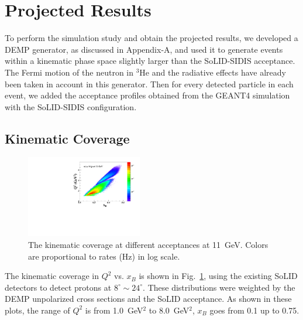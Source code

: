 \section{Projected Results}
To perform the simulation study and obtain the projected results, we developed a
DEMP generator, as discussed in Appendix-A, and used it to generate events within a
kinematic phase space slightly larger than the SoLID-SIDIS acceptance.  The
Fermi motion of the neutron in $\mathrm{^{3}He}$ and the radiative effects have
already been taken in account in this generator.  Then for every detected
particle in each event, we added the acceptance profiles obtained from the
GEANT4 simulation with the SoLID-SIDIS configuration.

\subsection{Kinematic Coverage}
\begin{figure}[!ht]
 \begin{center}
      \includegraphics[type=pdf,
        ext=.pdf,read=.pdf,width=0.45\textwidth]{./figures//E11_Q2_x_fermi}
  
   \caption[The kinematic coverage at different acceptances.]{\footnotesize{The
     kinematic coverage at different acceptances at 11~GeV. Colors are proportional to rates
(Hz) in log scale.}}
  \label{kin_cor}
  \end{center}
\end{figure}
The kinematic coverage in $Q^{2}$ vs. $x_{B}$ is shown in Fig.~\ref{kin_cor},
using the existing SoLID detectors to detect protons at $8^{\circ}\sim24^{\circ}$. These distributions were
weighted by the DEMP unpolarized cross sections and the SoLID acceptance.
As shown in these plots, the range of $Q^{2}$ is from 1.0~GeV$^{2}$ to
8.0~GeV$^{2}$, $x_{B}$ goes from 0.1 up to 0.75.


